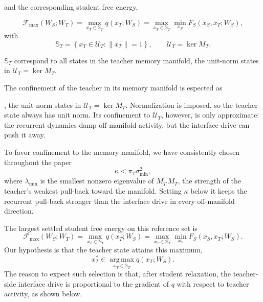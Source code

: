 \documentclass[10pt,letterpaper]{article}
\theoremstyle{plain}
\theoremstyle{remark}
\begin{document}
and the corresponding student free energy,

\begin{equation}
\mathcal F_{\max}(W_S;W_T)
=\max_{x_T\in\mathbb S_T}q(x_T;W_S)
=\max_{x_T\in\mathbb S_T}\min_{x_S}F_S(x_S,x_T;W_S),
\label{eq:empirical-maximum-settled-energy}
\end{equation}
with 
\begin{equation}
\mathbb S_T=\left\{x_T\in\mathcal U_T:\lVert x_T\rVert=1\right\},
\qquad \mathcal U_T=\ker M_T.
\label{eq:empirical-teacher-sphere}
\end{equation}

$\mathbb{S}_T$ correspond to all states in the teacher memory manifold, the unit-norm states in $\mathcal U_T=\ker M_T$.

The confinement of the teacher in its memory manifold is espected as 

, the unit-norm states in $\mathcal U_T=\ker M_T$. Normalization is imposed, so the teacher state always has unit norm. Its confinement to $\mathcal U_T$, however, is only approximate: the recurrent dynamics damp off-manifold activity, but the interface drive can push it away.

To favor confinement to the memory manifold, we have consistently chosen throughout the paper
\begin{equation}
\kappa<\pi_T\sigma_{\min}^2,
\label{eq:redistribution-confinement-regime}
\end{equation}
where $\lambda_{\min}$ is the smallest nonzero eigenvalue of $M_T^\top M_T$, the strength of the teacher's weakest pull-back toward the manifold. Setting $\kappa$ below it keeps the recurrent pull-back stronger than the interface drive in every off-manifold direction. 

The largest settled student free energy on this reference set is
\begin{equation}
\mathcal F_{\max}(W_S;W_T)
=\max_{x_T\in\mathbb S_T}q(x_T;W_S)
=\max_{x_T\in\mathbb S_T}\min_{x_S}F_S(x_S,x_T;W_S).
\label{eq:empirical-maximum-settled-energy}
\end{equation}
Our hypothesis is that the teacher state attains this maximum,
\begin{equation}
x_T^*\in\operatorname*{arg\,max}_{x_T\in\mathbb S_T}q(x_T;W_S).
\label{eq:empirical-selection-hypothesis}
\end{equation}
The reason to expect such selection is that, after student relaxation, the teacher-side interface drive is proportional to the gradient of \(q\) with respect to teacher activity, as shown below.
\end{document}
